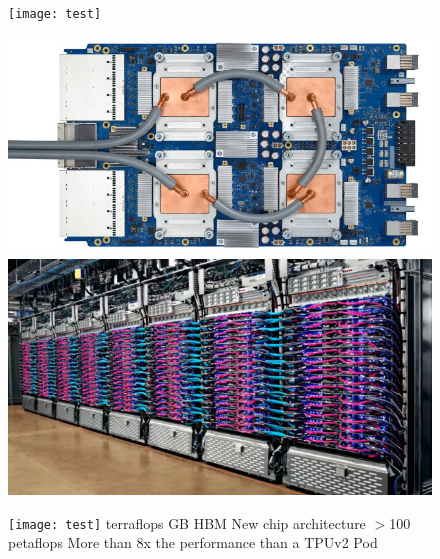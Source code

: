 \documentclass[c]{beamer}
\begin{document}
\begin{frame} [c]
\begin{figure}[t]
{\begin{minipage}[t]{65pt}
  \end{minipage}}
  \hfill
  {\begin{minipage}[t]{145pt}
    \texttt{[image: test]}
     \begin{center}
		 \includegraphics[scale=.2]{images/7btpuv3.png} 
		 \newline
		 \newline
		 \label{fig: TPUv3}
          \includegraphics[scale=.3]{images/7atpuv3pod.png}            \label{fig: Cloud TPUv3 pod}
            \end{center}
  \end{minipage}}
   {\begin{minipage}[t]{120pt}
    \texttt{[image: test]}
    \newline
    \newline
   {\small {} terraflops
 \newline
   \space {} GB HBM\newline
    New chip architecture
   \newline
\newline
\newline
\space \space $>$100 petaflops\newline 
\space \space More than 8x the performance than a TPUv2 Pod\newline
\space \space \newline
\newline
\newline
\newline}

  \end{minipage}}
\end{figure}
	\end{frame}
	
\end{document}
